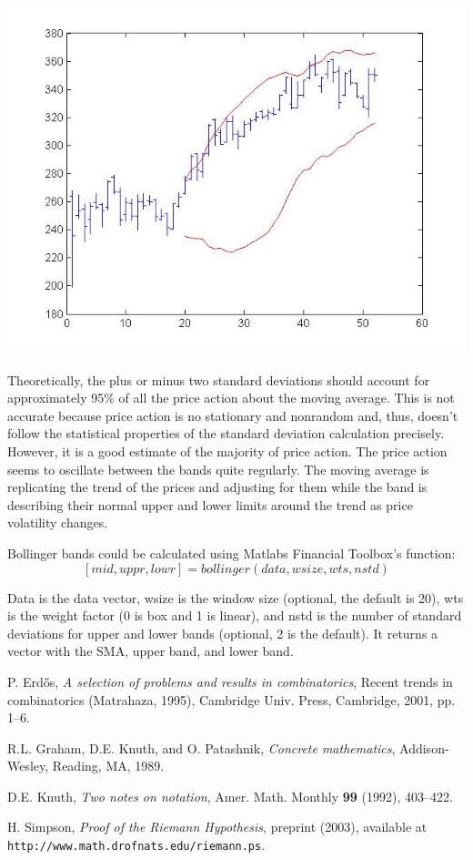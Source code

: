 \documentclass[12pt]{article}
\begin{document}
\includegraphics[height=4in,width=5.5in]{bollinger.jpg}

Theoretically, the plus or minus two standard deviations should account for approximately 95\% of all the price action about the moving average. This is not accurate because price action is no stationary and nonrandom and, thus, doesn't follow the statistical properties of the standard deviation calculation precisely. However, it is a good estimate of the majority of price action. The price action seems to oscillate between the bands quite regularly. The moving average is replicating the trend of the prices and adjusting for them while the band is describing their normal upper and lower limits around the trend as price volatility changes.

Bollinger bands could be calculated using Matlabs Financial Toolbox's function:
\[
		[mid, uppr, lowr]=bollinger(data, wsize, wts, nstd)
\]

Data is the data vector, wsize is the window size (optional, the default is 20), wts is the weight factor (0 is box and 1 is linear), and nstd is the number of standard deviations for upper and lower bands (optional, 2 is the default). It returns a vector with the SMA, upper band, and lower band.










\begin{thebibliography}{9}


 P. Erd\H os,
\emph{A selection of problems and results in combinatorics},
Recent trends in combinatorics (Matrahaza, 1995),
Cambridge Univ. Press, Cambridge, 2001, pp. 1--6.

R.L. Graham, D.E. Knuth, and O. Patashnik,
\emph{Concrete mathematics}, Addison-Wesley, Reading, MA, 1989.

 D.E. Knuth,
\emph{Two notes on notation}, Amer.
Math. Monthly \textbf{99} (1992), 403--422.

 H. Simpson,
\emph{Proof of the Riemann Hypothesis},
preprint (2003), available at
{\tt http://www.math.drofnats.edu/riemann.ps}.

\end{thebibliography}
 
\end{document}

